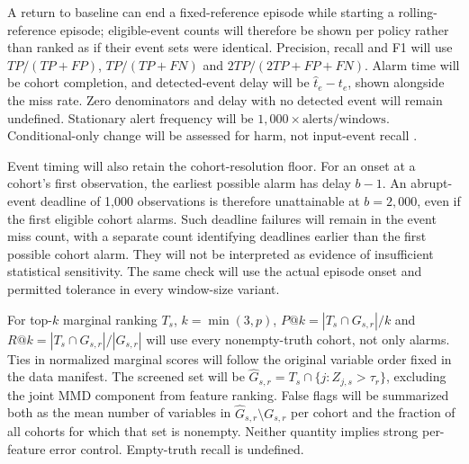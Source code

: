 \documentclass[11pt,a4paper]{article}
\begin{document}
A return to baseline can end a fixed-reference episode while starting a
rolling-reference episode; eligible-event counts will therefore be shown per
policy rather than ranked as if their event sets were identical. Precision,
recall and F1 will use $TP/(TP+FP)$, $TP/(TP+FN)$ and
$2TP/(2TP+FP+FN)$. Alarm time will be cohort completion, and detected-event delay
will be $\widehat t_e-t_e$, shown alongside the miss rate. Zero denominators
and delay with no detected event will remain undefined. Stationary alert
frequency will be $1{,}000\times\mathrm{alerts/windows}$.
Conditional-only change will be assessed for harm, not input-event recall
\cite{cerqueira,window}.

Event timing will also retain the cohort-resolution floor. For an onset at a
cohort's first observation, the earliest possible alarm has delay $b-1$.
An abrupt-event deadline of 1,000 observations is therefore unattainable at
$b=2{,}000$, even if the first eligible cohort alarms. Such deadline failures
will remain in the event miss count, with a separate count identifying
deadlines earlier than the first possible cohort alarm. They will not be
interpreted as evidence of insufficient statistical sensitivity. The same
check will use the actual episode onset and permitted tolerance in every
window-size variant.

For top-$k$ marginal ranking $T_s$, $k=\min(3,p)$,
$P@k=|T_s\cap G_{s,r}|/k$ and
$R@k=|T_s\cap G_{s,r}|/|G_{s,r}|$ will use every nonempty-truth cohort, not
only alarms. Ties in normalized marginal scores will follow the original
variable order fixed in the data manifest. The screened set will be
$\widehat G_{s,r}=T_s\cap\{j:Z_{j,s}>\tau_r\}$, excluding the joint MMD
component from feature ranking. False flags will be summarized both as the
mean number of variables in $\widehat G_{s,r}\setminus G_{s,r}$ per cohort
and the fraction of all cohorts for which that set is nonempty. Neither
quantity implies strong per-feature error control. Empty-truth recall is
undefined.
\end{document}
